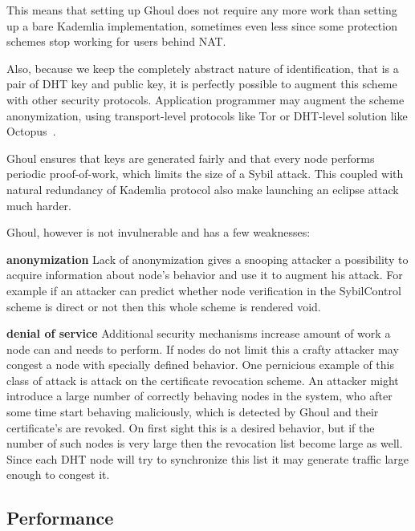   This means that setting up Ghoul does not require any more work than setting
  up a bare Kademlia implementation, sometimes even less since some protection
  schemes stop working for users behind NAT.

  Also, because we keep the completely abstract nature of identification, that
  is a pair of DHT key and public key, it is perfectly possible to augment this
  scheme with other security protocols. Application programmer may augment the
  scheme anonymization, using transport-level protocols like Tor or DHT-level
  solution like Octopus~\cite{wan12b}.

  Ghoul ensures that keys are generated fairly and that every node performs
  periodic proof-of-work, which limits the size of a Sybil attack. This coupled
  with natural redundancy of Kademlia protocol also make launching an eclipse
  attack much harder.

  Ghoul, however is not invulnerable and has a few weaknesses:

  \begin{description}
    \item{\textbf{anonymization}} Lack of anonymization gives a snooping
      attacker a possibility to acquire information about node's behavior and
      use it to augment his attack. For example if an attacker can predict
      whether node verification in the SybilControl scheme is direct or not then
      this whole scheme is rendered void.
    \item{\textbf{denial of service}} Additional security mechanisms increase
      amount of work a node can and needs to perform. If nodes do not limit this
      a crafty attacker may congest a node with specially defined behavior. One
      pernicious example of this class of attack is attack on the certificate
      revocation scheme. An attacker might introduce a large number of correctly
      behaving nodes in the system, who after some time start behaving
      maliciously, which is detected by Ghoul and their certificate's are
      revoked. On first sight this is a desired behavior, but if the number of
      such nodes is very large then the revocation list become large as well.
      Since each DHT node will try to synchronize this list it may generate
      traffic large enough to congest it.
  \end{description}

  \subsection{Performance}


